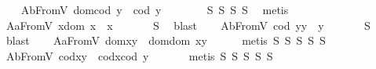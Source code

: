 \begin{isabellebody}
\isanewline
%
\endisadelimproof
\ \ \isamarkupfalse%
\ A{}bFromV{\isacharcolon}\ {\isachardoublequoteopen}dom{\isacharparenleft}cod\ y{\isacharparenright}\ {\isasymcong}\ cod\ y{\isachardoublequoteclose}\ \ \isanewline
%
\isadelimproof
\ \ \ \ %
\endisadelimproof
%
\isatagproof
{}\isamarkupfalse%
\ S{}\ S{}\ S{}\ S{}\ \isamarkupfalse%
\ metis%
\endisatagproof
{\isafoldproof}%
%
\isadelimproof
\isanewline
%
\endisadelimproof
\ \ \isamarkupfalse%
\ A{}aFromV{\isacharcolon}\ {\isachardoublequoteopen}x{\isasymcdot}{\isacharparenleft}dom\ x{\isacharparenright}\ {\isasymcong}\ x{\isachardoublequoteclose}\ \isanewline
%
\isadelimproof
\ \ \ \ %
\endisadelimproof
%
\isatagproof
{}\isamarkupfalse%
\ S{}\ \isamarkupfalse%
\ blast%
\endisatagproof
{\isafoldproof}%
%
\isadelimproof
\isanewline
%
\endisadelimproof
\ \ \isamarkupfalse%
\ A{}bFromV{\isacharcolon}\ {\isachardoublequoteopen}{\isacharparenleft}cod\ y{\isacharparenright}{\isasymcdot}y\ {\isasymcong}\ y{\isachardoublequoteclose}\ \isanewline
%
\isadelimproof
\ \ \ \ %
\endisadelimproof
%
\isatagproof
{}\isamarkupfalse%
\ S{}\ \isamarkupfalse%
\ blast%
\endisatagproof
{\isafoldproof}%
%
\isadelimproof
\isanewline
%
\endisadelimproof
\ \ \isamarkupfalse%
\ A{}aFromV{\isacharcolon}\ {\isachardoublequoteopen}dom{\isacharparenleft}x{\isasymcdot}y{\isacharparenright}\ {\isasymcong}\ dom{\isacharparenleft}{\isacharparenleft}dom\ x{\isacharparenright}{\isasymcdot}y{\isacharparenright}{\isachardoublequoteclose}\isanewline
%
\isadelimproof
\ \ \ \ %
\endisadelimproof
%
\isatagproof
{}\isamarkupfalse%
\ {\isacharparenleft}metis\ S{}\ S{}\ S{}\ S{}\ S{}{\isacharparenright}%
\endisatagproof
{\isafoldproof}%
%
\isadelimproof
\isanewline
%
\endisadelimproof
\ \ \isamarkupfalse%
\ A{}bFromV{\isacharcolon}\ {\isachardoublequoteopen}cod{\isacharparenleft}x{\isasymcdot}y{\isacharparenright}\ {\isasymcong}\ cod{\isacharparenleft}x{\isasymcdot}{\isacharparenleft}cod\ y{\isacharparenright}{\isacharparenright}{\isachardoublequoteclose}\ \isanewline
%
\isadelimproof
\ \ \ \ %
\endisadelimproof
%
\isatagproof
{}\isamarkupfalse%
\ {\isacharparenleft}metis\ S{}\ S{}\ S{}\ S{}\ S{}{\isacharparenright}%

\end{isabellebody}

